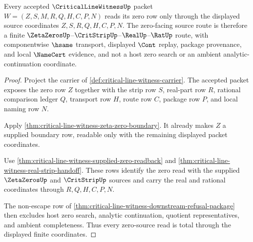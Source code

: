 \begin{theorem}
\label{thm:critical-line-witness-zero-source-totality}
Every accepted $\CriticalLineWitnessUp$ packet $W=(Z,S,M,R,Q,H,C,P,N)$ reads its zero row only through the displayed source coordinates $Z,S,R,Q,H,C,P,N$. The zero-facing source route is therefore a finite $\ZetaZerosUp$--$\CritStripUp$--$\RealUp$--$\RatUp$ route, with componentwise $\hsame$ transport, displayed $\Cont$ replay, package provenance, and local $\NameCert$ evidence, and not a host zero search or an ambient analytic-continuation coordinate.
\end{theorem}
\begin{proof}
Project the carrier of \autoref{def:critical-line-witness-carrier}. The accepted packet exposes the zero row $Z$ together with the strip row $S$, real-part row $R$, rational comparison ledger $Q$, transport row $H$, route row $C$, package row $P$, and local naming row $N$.

Apply \autoref{thm:critical-line-witness-zeta-zero-boundary}. It already makes $Z$ a supplied boundary row, readable only with the remaining displayed packet coordinates.

Use \autoref{thm:critical-line-witness-supplied-zero-readback} and \autoref{thm:critical-line-witness-real-strip-handoff}. These rows identify the zero read with the supplied $\ZetaZerosUp$ and $\CritStripUp$ sources and carry the real and rational coordinates through $R,Q,H,C,P,N$.

The non-escape row of \autoref{thm:critical-line-witness-downstream-refusal-package} then excludes host zero search, analytic continuation, quotient representatives, and ambient completeness. Thus every zero-source read is total through the displayed finite coordinates.
\end{proof}

